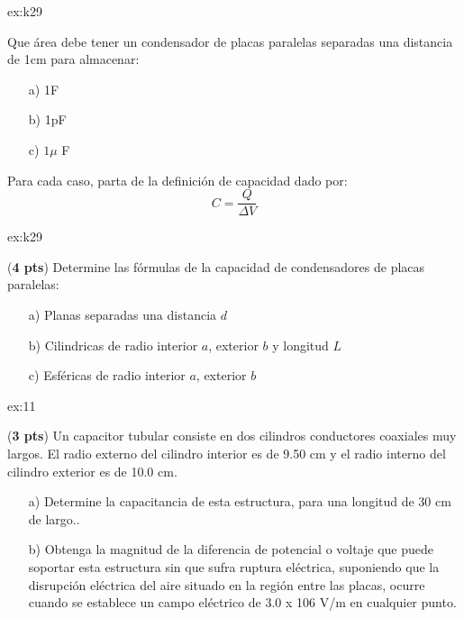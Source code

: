 \begin{multicols}{2}
\begin{excercise}[][][]{ex:k29}
{        Que área debe tener un condensador de placas paralelas separadas una distancia de 1cm para almacenar:
        \begin{itemize}
             \item[a)] 1F
             \item[b)] 1pF            
             \item[c)] $1\mu$ F
         \end{itemize}
         Para cada caso, parta de la definición de capacidad dado por:
         \begin{equation*}
             C=\frac{Q}{\Delta V}
         \end{equation*}
         }
    \end{excercise}
    \begin{excercise}[][][]{ex:k29}{(\textbf{4 pts})       Determine las fórmulas de la capacidad de condensadores de placas paralelas: 
        \begin{itemize}
             \item[a)] Planas separadas una distancia $d$
             \item[b)] Cilindricas de radio interior $a$, exterior $b$ y longitud $L$
             \item[c)] Esféricas de radio interior $a$, exterior $b$  
         \end{itemize}
         }
    \end{excercise}
    \begin{excercise}[][][$d=2.6\,\mathrm{m}$]{ex:11}{ (\textbf{3 pts})  
        Un capacitor tubular  consiste en dos cilindros conductores coaxiales muy largos. El radio externo del cilindro interior es de 9.50 cm y el radio interno del cilindro exterior es de 10.0 cm.
        \begin{itemize}
             \item[a)]  Determine la capacitancia de esta estructura, para una longitud de 30 cm de largo.. 
             \item[b)]  Obtenga la magnitud de la diferencia de potencial o voltaje que puede soportar esta estructura sin que sufra ruptura eléctrica, suponiendo que la disrupción eléctrica del aire situado en la región entre las placas, ocurre cuando se establece un campo eléctrico de 3.0 x 106 V/m en cualquier punto.
         \end{itemize}   
     }
    \end{excercise}


\end{multicols}
